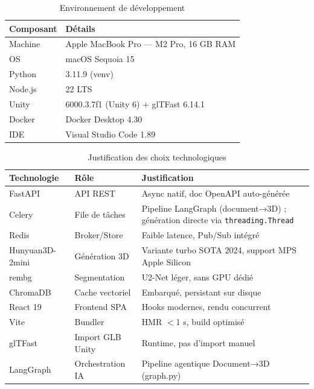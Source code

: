 \documentclass[12pt,a4paper,oneside]{report}
\newcommand{\theadrow}{\rowcolor{tekupblue!12}}
\begin{document}
\begin{table}[H]
\centering
\caption{Environnement de développement}
\label{tab:env}
\begin{tabularx}{\linewidth}{@{}lX@{}}
\toprule
\theadrow
\textbf{Composant} & \textbf{Détails} \\\midrule
Machine     & Apple MacBook Pro — M2 Pro, 16 GB RAM \\
OS          & macOS Sequoia 15 \\
Python      & 3.11.9 (venv) \\
Node.js     & 22 LTS \\
Unity       & 6000.3.7f1 (Unity 6) + glTFast 6.14.1 \\
Docker      & Docker Desktop 4.30 \\
IDE         & Visual Studio Code 1.89 \\
\bottomrule
\end{tabularx}
\end{table}

\begin{table}[H]
\centering
\caption{Justification des choix technologiques}
\label{tab:stack}
\begin{tabularx}{\linewidth}{@{}llX@{}}
\toprule
\theadrow
\textbf{Technologie} & \textbf{Rôle} & \textbf{Justification} \\\midrule
FastAPI~\cite{fastapi} & API REST & Async natif, doc OpenAPI auto-générée \\
Celery~\cite{celery} & File de tâches & Pipeline LangGraph (document→3D) ; génération directe via \texttt{threading.Thread} \\
Redis~\cite{redis} & Broker/Store & Faible latence, Pub/Sub intégré \\
Hunyuan3D-2mini & Génération 3D & Variante turbo SOTA 2024, support MPS Apple Silicon \\
rembg       & Segmentation     & U2-Net léger, sans GPU dédié \\
ChromaDB    & Cache vectoriel  & Embarqué, persistant sur disque \\
React 19~\cite{react} & Frontend SPA & Hooks modernes, rendu concurrent \\
Vite~\cite{vite} & Bundler & HMR $<$1 s, build optimisé \\
glTFast~\cite{gltfast} & Import GLB Unity & Runtime, pas d'import manuel \\
LangGraph   & Orchestration IA & Pipeline agentique Document→3D (graph.py) \\
\bottomrule
\end{tabularx}
\end{table}
\end{document}
